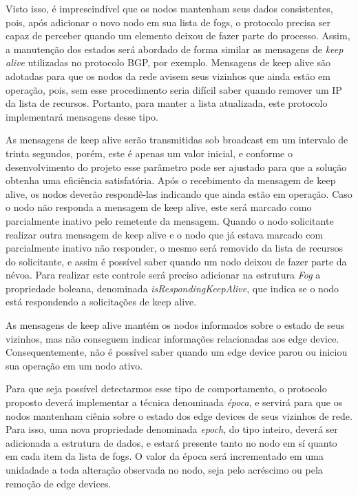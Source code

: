 Visto isso, é imprescindível que os nodos mantenham seus dados consistentes, pois, após adicionar o novo nodo em sua lista de fogs, o protocolo precisa ser capaz de perceber quando um elemento
deixou de fazer parte do processo. Assim, a manutenção dos estados será abordado de forma similar as mensagens de \textit{keep alive} utilizadas no protocolo BGP, por exemplo.
Mensagens de keep alive são adotadas para que os nodos da rede avisem seus vizinhos que ainda estão em operação, pois, sem esse procedimento seria difícil
saber quando remover um IP da lista de recursos. Portanto, para manter a lista atualizada, este protocolo implementará mensagens desse tipo.

As mensagens de keep alive serão transmitidas sob broadcast em um intervalo de trinta segundos, porém, este é apenas um valor inicial, e conforme o desenvolvimento do projeto esse
parâmetro pode ser ajustado para que a solução obtenha uma eficiência satisfatória.
Após o recebimento da mensagem de keep alive, os nodos deverão respondê-las indicando que ainda estão em operação.
Caso o nodo não responda a mensagem de keep alive, este será marcado como parcialmente inativo pelo remetente da mensagem.
Quando o nodo solicitante realizar outra mensagem de keep alive e o nodo que já estava marcado com parcialmente inativo não responder, o mesmo será removido da lista de recursos do
solicitante, e assim é possível saber quando um nodo deixou de fazer parte da névoa.
Para realizar este controle será preciso adicionar na estrutura \textit{Fog} a propriedade boleana, denominada \textit{isRespondingKeepAlive}, que indica se o nodo está respondendo a solicitações de keep alive.

As mensagens de keep alive mantém os nodos informados sobre o estado de seus vizinhos, mas não conseguem indicar informações relacionadas aos edge device.
Consequentemente, não é possível saber quando um edge device parou ou iniciou sua operação em um nodo ativo.

Para que seja possível detectarmos esse tipo de comportamento, o protocolo proposto deverá implementar a técnica denominada \textit{época},
e servirá para que os nodos mantenham ciênia sobre o estado dos edge devices de seus vizinhos de rede.
Para isso, uma nova propriedade denominada \textit{epoch}, do tipo inteiro, deverá ser adicionada a estrutura de dados, e estará presente tanto no nodo em sí quanto em cada item da lista de fogs.
O valor da época será incrementado em uma unidadade a toda alteração observada no nodo, seja pelo acréscimo ou pela remoção de edge devices.

